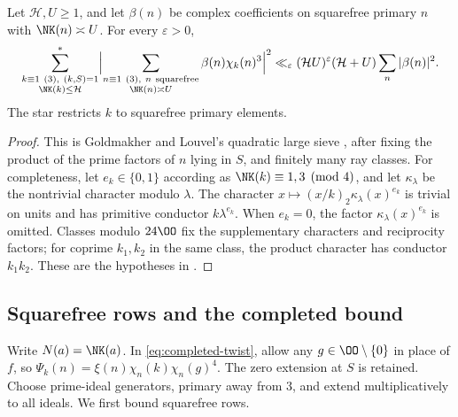 \begin{lemma}\label{lem:quadratic}
Let $\mathcal H,U\ge1$, and let $\beta(n)$ be complex coefficients
on squarefree primary $n$ with $\NK(n)\asymp U$.
For every $\varepsilon>0$,
\begin{equation}\label{eq:Q}
 \sum_{\substack{k\equiv1\ (3),\ (k,S)=1\\\NK(k)\le\mathcal H}}^*
 \Bigl|\sum_{\substack{n\equiv1\ (3),\ n\ {\rm squarefree}\\
                       \NK(n)\asymp U}}
       \beta(n)\chi_k(n)^3\Bigr|^2
 \ll_{\varepsilon}(\mathcal HU)^\varepsilon(\mathcal H+U)
       \sum_n|\beta(n)|^2.
\end{equation}
The star restricts $k$ to squarefree primary elements.
\end{lemma}
\begin{proof}
This is Goldmakher and Louvel's quadratic large sieve \cite[Theorem~1.1]{GL}, after
fixing the product of the prime factors of $n$ lying in $S$, and finitely many ray classes.
For completeness, let $e_k\in\{0,1\}$ according as
$\NK(k)\equiv1,3\pmod4$, and let $\kappa_\lambda$ be the nontrivial
character modulo $\lambda$. The character
$x\mapsto(x/k)_2\kappa_\lambda(x)^{e_k}$ is trivial on
units and has primitive conductor $k\lambda^{e_k}$.
When $e_k=0$, the factor $\kappa_\lambda(x)^{e_k}$ is omitted.
Classes modulo $24\OO$ fix the supplementary characters and
reciprocity factors; for coprime $k_1,k_2$ in the same class, the
product character has conductor $k_1k_2$.
These are the hypotheses in \cite[Definition~1 and \S2]{GL}.
\end{proof}

\subsection{Squarefree rows and the completed bound}
Write $N(a)=\NK(a)$. In \eqref{eq:completed-twist}, allow any
$g\in\OO\setminus\{0\}$ in place of $f$, so
$\Psi_k(n)=\xi(n)\chi_n(k)\chi_n(g)^4$.
The zero extension at $S$ is retained.
Choose prime-ideal generators, primary away from $3$, and extend
multiplicatively to all ideals. We first bound squarefree rows.

